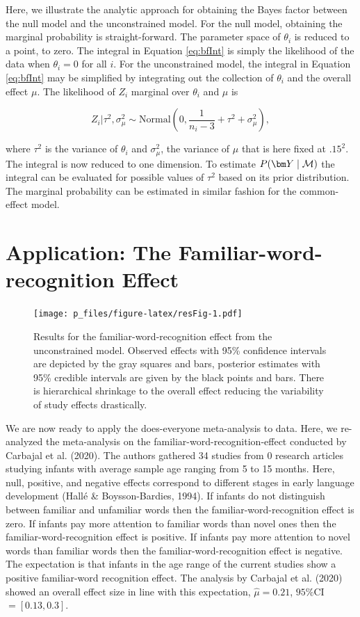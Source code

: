 \documentclass[english,,man]{apa6}
\begin{document}
Here, we illustrate the analytic approach for obtaining the Bayes factor between the null model and the unconstrained model. For the null model, obtaining the marginal probability is straight-forward. The parameter space of \(\theta_i\) is reduced to a point, to zero. The integral in Equation \eqref{eq:bfInt} is simply the likelihood of the data when \(\theta_i = 0\) for all \(i\). For the unconstrained model, the integral in Equation \eqref{eq:bfInt} may be simplified by integrating out the collection of \(\theta_i\) and the overall effect \(\mu\). The likelihood of \(Z_i\) marginal over \(\theta_i\) and \(\mu\) is

\[Z_i | \tau^2, \sigma^2_\mu \sim \mbox{Normal}(0, \frac{1}{n_i - 3} + \tau^2 + \sigma^2_\mu),\]

where \(\tau^2\) is the variance of \(\theta_i\) and \(\sigma^2_\mu\), the variance of \(\mu\) that is here fixed at \(.15^2\). The integral is now reduced to one dimension. To estimate \(P(\bm Y\mid {\cal M})\) the integral can be evaluated for possible values of \(\tau^2\) based on its prior distribution. The marginal probability can be estimated in similar fashion for the common-effect model.

\hypertarget{application-the-familiar-word-recognition-effect}{%
\section{Application: The Familiar-word-recognition Effect}\label{application-the-familiar-word-recognition-effect}}

\begin{figure}
\centering
\texttt{[image: p\_files/figure-latex/resFig-1.pdf]}
\caption{\label{fig:resFig}Results for the familiar-word-recognition effect from the unconstrained model. Observed effects with 95\% confidence intervals are depicted by the gray squares and bars, posterior estimates with 95\% credible intervals are given by the black points and bars. There is hierarchical shrinkage to the overall effect reducing the variability of study effects drastically.}
\end{figure}

We are now ready to apply the does-everyone meta-analysis to data. Here, we re-analyzed the meta-analysis on the familiar-word-recognition-effect conducted by Carbajal et al. (2020). The authors gathered 34 studies from 0 research articles studying infants with average sample age ranging from 5 to 15 months. Here, null, positive, and negative effects correspond to different stages in early language development (Hallé \& Boysson-Bardies, 1994). If infants do not distinguish between familiar and unfamiliar words then the familiar-word-recognition effect is zero. If infants pay more attention to familiar words than novel ones then the familiar-word-recognition effect is positive. If infants pay more attention to novel words than familiar words then the familiar-word-recognition effect is negative. The expectation is that infants in the age range of the current studies show a positive familiar-word recognition effect. The analysis by Carbajal et al. (2020) showed an overall effect size in line with this expectation, \(\hat{\mu} = 0.21\), \(95\%\)CI \(= [0.13, 0.3]\).
\end{document}
